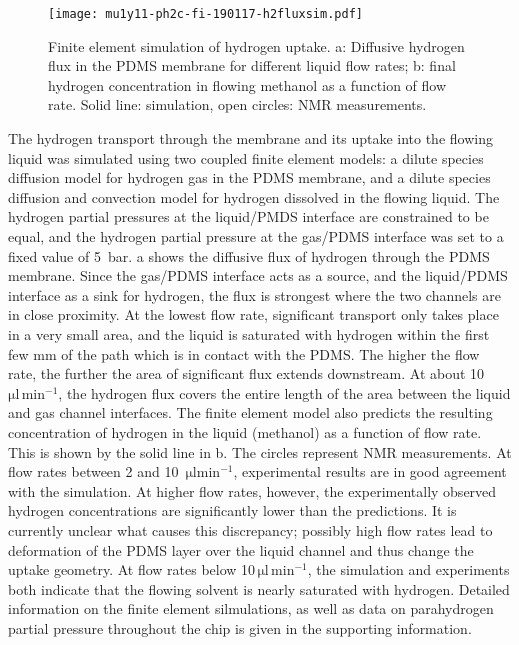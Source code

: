 \begin{figure}
	\texttt{[image: mu1y11-ph2c-fi-190117-h2fluxsim.pdf]}
	\caption{
		Finite element simulation of hydrogen uptake. a: Diffusive hydrogen
		flux in the PDMS membrane for different liquid flow rates;
		b: final hydrogen concentration in flowing methanol as a function of
		flow rate. Solid line: simulation, open circles: NMR measurements.
	}
	\label{fig:h2fluxsim}
\end{figure}

The hydrogen transport through the membrane and its uptake into the flowing
liquid was simulated using two coupled finite element models: a dilute species
diffusion model for hydrogen gas in the PDMS membrane, and a dilute species
diffusion and convection model for hydrogen dissolved in the flowing liquid. The
hydrogen partial pressures at the liquid/PMDS interface are constrained to be
equal, and the hydrogen partial pressure at the gas/PDMS interface was set to a
fixed value of 5~bar. a shows the diffusive flux of hydrogen
through the PDMS membrane.  Since the gas/PDMS interface acts as a source, and
the liquid/PDMS interface as a sink for hydrogen, the flux is strongest where
the two channels are in close proximity. At the lowest flow rate, significant
transport only takes place in a very small area, and the liquid is saturated
with hydrogen within the first few mm of the path which is in contact with the
PDMS. The higher the flow rate, the further the area of significant flux extends
downstream. At about 10~$\mathrm{\mu l \,min^{-1}}$, the hydrogen flux covers
the entire length of the area between the liquid and gas channel interfaces. The
finite element model also predicts the resulting concentration of hydrogen in
the liquid (methanol) as a function of flow rate. This is shown by the solid
line in  b. The circles represent NMR measurements. At
flow rates between 2 and 10~$\mathrm{\mu l min^{-1}}$, experimental results are
in good agreement with the simulation. At higher flow rates, however, the
experimentally observed hydrogen concentrations are significantly lower than the
predictions. It is currently unclear what causes this discrepancy; possibly high
flow rates lead to deformation of the PDMS layer over the liquid channel and
thus change the uptake geometry. At flow rates below 10$\,\mathrm{\mu l
\,min^{-1}}$, the simulation and experiments both indicate that the flowing
solvent is nearly saturated with hydrogen. Detailed information on the finite
element silmulations, as well as data on parahydrogen partial pressure
throughout the chip is given in the supporting information.

